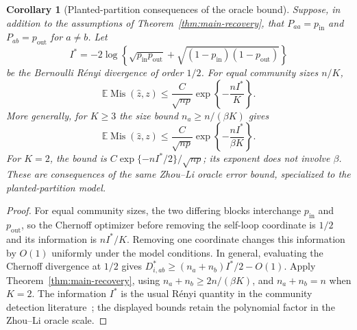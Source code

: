\documentclass[11pt]{article}
\newtheorem{corollary}[theorem]{Corollary}
\theoremstyle{definition}
\theoremstyle{remark}
\newcommand{\Mis}{\operatorname{Mis}}
\newcommand{\E}{\mathbb E}
\numberwithin{equation}{section}
\begin{document}
\begin{corollary}[Planted-partition consequences of the oracle bound]
\label{cor:planted-partition-rate}
Suppose, in addition to the assumptions of Theorem~\ref{thm:main-recovery},
that $P_{aa}=p_{\mathrm{in}}$ and $P_{ab}=p_{\mathrm{out}}$ for $a\ne b$.
Let
\begin{equation}
 I^*=-2\log\!\left\{
 \sqrt{p_{\mathrm{in}}p_{\mathrm{out}}}
 +\sqrt{(1-p_{\mathrm{in}})(1-p_{\mathrm{out}})}
 \right\}
 \label{eq:renyi-half-information}
\end{equation}
be the Bernoulli R\'enyi divergence of order $1/2$.
For equal community sizes $n/K$,
\begin{equation}
 \E\Mis(\widehat z,z)
 \le \frac{C}{\sqrt{np}}\exp\!\left\{-\frac{nI^*}{K}\right\}.
 \label{eq:balanced-planted-partition-rate}
\end{equation}
More generally, for $K\ge3$ the size bound $n_a\ge n/(\beta K)$ gives
\[
 \E\Mis(\widehat z,z)
 \le \frac{C}{\sqrt{np}}\exp\!\left\{-\frac{nI^*}{\beta K}\right\}.
\]
For $K=2$, the bound is $C\exp\{-nI^*/2\}/\sqrt{np}$;
its exponent does not involve $\beta$. These are consequences of the same
Zhou--Li oracle error bound, specialized to the planted-partition model.
\end{corollary}

\begin{proof}
For equal community sizes, the two differing blocks interchange
$p_{\mathrm{in}}$ and $p_{\mathrm{out}}$, so the Chernoff optimizer
before removing the self-loop coordinate is $1/2$ and its information is
$nI^*/K$. Removing one coordinate changes this information by $O(1)$
uniformly under the model conditions. In general, evaluating the
Chernoff divergence at $1/2$ gives
$D^*_{i,ab}\ge(n_a+n_b)I^*/2-O(1)$.
Apply Theorem~\ref{thm:main-recovery}, using $n_a+n_b\ge2n/(\beta K)$,
and $n_a+n_b=n$ when $K=2$.
The information $I^*$ is the usual R\'enyi quantity in the community
detection literature~\citep{gao2017}; the displayed bounds retain the
polynomial factor in the Zhou--Li oracle scale.
\end{proof}
\end{document}
